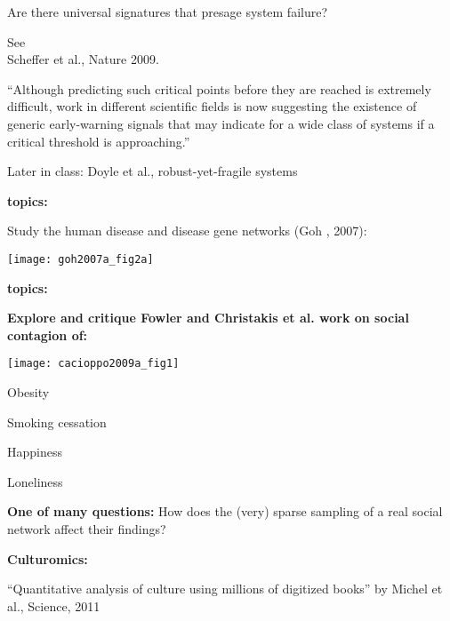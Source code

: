     Are there \alert{universal signatures} that presage system failure?
  
    See \\
    Scheffer et al., Nature 2009.\cite{scheffer2009a}
  
    ``Although predicting
    such critical points before they are reached is extremely difficult,
    work in different scientific fields is now suggesting the existence of
    generic early-warning signals that may indicate for a wide class of
    systems if a critical threshold is approaching.''
   
    Later in class: Doyle et al., robust-yet-fragile systems
  
  



  \textbf{topics:}

  
  
   
    Study the human disease and disease gene networks (Goh \etal, 2007):
  
  \texttt{[image: goh2007a\_fig2a]}
  


  \textbf{topics:}

  \textbf{Explore and critique Fowler and Christakis et al. work on
      social contagion of:}
          
      \texttt{[image: cacioppo2009a\_fig1]}
      
      
       
        Obesity\cite{christakis2007a}
      
        Smoking cessation\cite{christakis2008a}
      
        Happiness\cite{fowler2008a}
      
        Loneliness\cite{cacioppo2009a}
      
      

  \textbf{One of many questions:}
    How does the (very) sparse sampling
    of a real social network affect their findings?
  



  \textbf{Culturomics:}

  \small{``Quantitative analysis of culture using millions of
    digitized books'' by Michel et al., Science, 2011\cite{michel2011a}}

